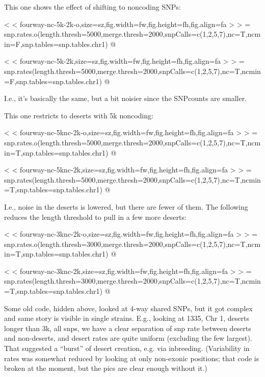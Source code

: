 \documentclass{article}\usepackage[]{graphicx}\usepackage[]{color}
\begin{document}
This one shows the effect of shifting to noncoding SNPs:

< < fourway-nc-5k-2k-o,size=sz,fig.width=fw,fig.height=fh,fig.align=fa > > =
snp.rates.o(length.thresh=5000,merge.thresh=2000,snpCalls=c(1,2,5,7),nc=T,ncmin=F,snp.tables=snp.tables.chr1)
@


< < fourway-nc-5k-2k,size=sz,fig.width=fw,fig.height=fh,fig.align=fa > > =
snp.rates(length.thresh=5000,merge.thresh=2000,snpCalls=c(1,2,5,7),nc=T,ncmin=F,snp.tables=snp.tables.chr1)
@

I.e., it's basically the same, but a bit noisier since the SNPcounts are smaller.

This one restricts to deserts with 5k noncoding:

< < fourway-nc-5knc-2k-o,size=sz,fig.width=fw,fig.height=fh,fig.align=fa > > =
snp.rates.o(length.thresh=5000,merge.thresh=2000,snpCalls=c(1,2,5,7),nc=T,ncmin=T,snp.tables=snp.tables.chr1)
@

< < fourway-nc-5knc-2k,size=sz,fig.width=fw,fig.height=fh,fig.align=fa > > =
snp.rates(length.thresh=5000,merge.thresh=2000,snpCalls=c(1,2,5,7),nc=T,ncmin=T,snp.tables=snp.tables.chr1)
@

I.e., noise in the deserts is lowered, but there are fewer of them.  The following reduces the length threshold to pull
in a few more deserts:

< < fourway-nc-3knc-2k-o,size=sz,fig.width=fw,fig.height=fh,fig.align=fa > > =
snp.rates.o(length.thresh=3000,merge.thresh=2000,snpCalls=c(1,2,5,7),nc=T,ncmin=T,snp.tables=snp.tables.chr1)
@

< < fourway-nc-3knc-2k,size=sz,fig.width=fw,fig.height=fh,fig.align=fa > > =
snp.rates(length.thresh=3000,merge.thresh=2000,snpCalls=c(1,2,5,7),nc=T,ncmin=T,snp.tables=snp.tables.chr1)
@
\fi

Some old code, hidden above, looked at 4-way shared SNPs, but it got complex and same story is visible in single strains.  E.g., looking at 1335, Chr 1, deserts longer than 3k, all snps, we have a clear separation of snp rate between deserts and non-deserts, and desert rates are quite uniform (excluding the few largest).  That suggested a ``burst'' of desert creation, e.g. via inbreeding.  (Variability in rates was somewhat reduced by looking at only non-exonic positions; that code is broken at the moment, but the pics are clear enough without it.)
\end{document}
